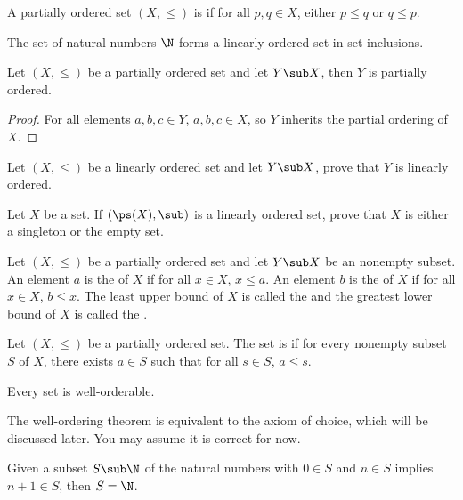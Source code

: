 \documentclass[10pt]{article}
\begin{document}
\begin{definition}
    A partially ordered set $(X,\le)$ is  if for all $p,q\in X$, either $p\le q$ or $q\le p$.
\end{definition}
\begin{example}
    The set of natural numbers $\N$ forms a linearly ordered set in set inclusions.
\end{example}
\begin{proposition}
    Let $(X,\le)$ be a partially ordered set and let $Y\sub X$, then $Y$ is partially ordered.
\end{proposition}
\begin{proof}
    For all elements $a,b,c\in Y$, $a,b,c\in X$, so $Y$ inherits the partial ordering of $X$.
\end{proof}
\begin{problem}
    Let $(X,\le)$ be a linearly ordered set and let $Y\sub X$, prove that $Y$ is linearly ordered.
\end{problem}
\begin{problem}
    Let $X$ be a set. If $(\ps(X),\sub)$ is a linearly ordered set, prove that $X$ is either a singleton or the empty set.
\end{problem}
\begin{definition}
    Let $(X,\le)$ be a partially ordered set and let $Y\sub X$ be an nonempty subset. An element $a$ is the  of $X$ if for all $x\in X$, $x\le a$. An element $b$ is the  of $X$ if for all $x\in X$, $b\le x$. The least upper bound of $X$ is called the  and the greatest lower bound of $X$ is called the .
\end{definition}
\begin{definition}
    Let $(X,\le)$ be a partially ordered set. The set is  if for every nonempty subset $S$ of $X$, there exists $a\in S$ such that for all $s\in S$, $a\le s$.
\end{definition}
\begin{theorem}
    Every set is well-orderable.
\end{theorem}
\par
The well-ordering theorem is equivalent to the axiom of choice, which will be discussed later. You may assume it is correct for now. 
\begin{theorem}
    Given a subset $S\sub\N$ of the natural numbers with $0\in S$ and $n\in S$ implies $n+1\in S$, then $S=\N$.
\end{theorem}
\end{document}
